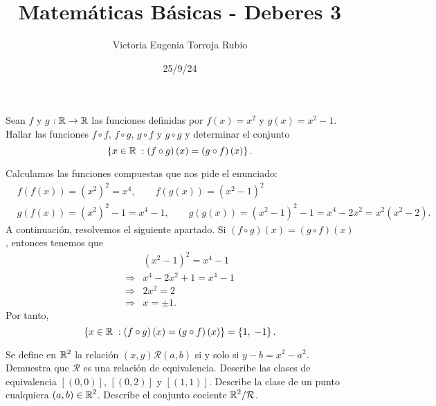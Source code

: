 \documentclass{article}
\begin{document}
\title{Matemáticas Básicas - Deberes 3}
\author{Victoria Eugenia Torroja Rubio}
\date{25/9/24}

\maketitle

\begin{ej}
Sean $\displaystyle f $ y $\displaystyle g $ $\displaystyle : \mathbb{R} \to \mathbb{R} $ las funciones definidas por $\displaystyle f\left(x\right) = x^{2} $ y $\displaystyle g\left(x\right) = x^{2}-1 $. Hallar las funciones $\displaystyle f\circ f $, $\displaystyle f \circ g $, $\displaystyle g\circ f $ y $\displaystyle g \circ g $ y determinar el conjunto
\[ \left \{ x \in \mathbb{R} \; : \left(f \circ g\right)\left(x\right)=\left(g\circ f\right)\left(x\right)\right \}  .\]
\end{ej}

\begin{sol}
Calculamos las funciones compuestas que nos pide el enunciado:
\[
\begin{split}
& f\left(f\left(x\right)\right) = \left(x^{2}\right)^{2} = x^{4},\quad \quad f\left(g\left(x\right)\right) = \left(x^{2}-1\right)^{2} \\
& g\left(f\left(x\right)\right) = \left(x^{2}\right)^{2}-1 = x^{4}- 1,\quad \quad g\left(g\left(x\right)\right)= \left(x^{2}-1\right)^{2}-1 = x^{4} - 2x^{2}=x^{2}\left(x^{2}-2\right).
\end{split}
\]
A continuación, resolvemos el siguiente apartado. Si $\displaystyle \left(f\circ g\right)\left(x\right) = \left(g\circ f\right)\left(x\right) $, entonces tenemos que 
\[
\begin{split}
& \left(x^{2}-1\right)^{2} = x^{4}-1 \\
\Rightarrow & x^{4} -2x^{2} + 1 = x^{4}-1 \\
\Rightarrow & 2x^{2} = 2 \\
\Rightarrow & x = \pm 1.
\end{split}
\]
Por tanto, 
\[ \left \{ x \in \mathbb{R} \; : \left(f \circ g\right)\left(x\right)=\left(g\circ f\right)\left(x\right)\right \} = \left \{ 1, \; -1\right \}  .\]

\end{sol}


\begin{ej}
	Se define en $\displaystyle \mathbb{R}^{2} $ la relación $\displaystyle \left(x,y\right)\mathcal{R}\left(a,b\right) $ si y solo si $\displaystyle y-b = x^{2}-a^{2} $. Demuestra que $\displaystyle \mathcal{R} $ es una relación de equivalencia. Describe las clases de equivalencia $\displaystyle \left[\left(0,0\right)\right]  $, $\displaystyle \left[\left(0,2\right)\right]  $ y $\displaystyle \left[\left(1,1\right)\right]  $. Describe la clase de un punto cualquiera $\displaystyle \left(a,b\right)\in\mathbb{R}^{2} $. Describe el conjunto cociente $\displaystyle \mathbb{R}^{2}/\mathcal{R} $. 
\end{ej}
\end{document}
